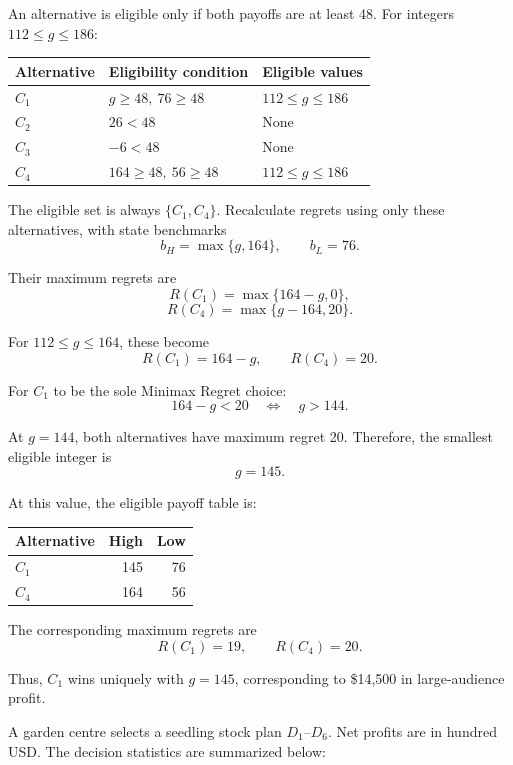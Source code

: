 An alternative is eligible only if both payoffs
are at least 48. For integers $112\le g\le186$:

\begin{center}
\begin{tabular}{lll}\toprule
Alternative & Eligibility condition & Eligible values\\\midrule
$C_1$ & $g\ge48,\ 76\ge48$ & $112\le g\le186$\\
$C_2$ & $26<48$ & None\\
$C_3$ & $-6<48$ & None\\
$C_4$ & $164\ge48,\ 56\ge48$ & $112\le g\le186$\\
\bottomrule
\end{tabular}
\end{center}

The eligible set is always $\{C_1,C_4\}$.
Recalculate regrets using only these alternatives,
with state benchmarks
\[
b_H=\max\{g,164\},\qquad b_L=76.
\]

Their maximum regrets are
\[
R(C_1)=\max\{164-g,0\},
\]
\[
R(C_4)=\max\{g-164,20\}.
\]

For $112\le g\le164$, these become
\[
R(C_1)=164-g,\qquad R(C_4)=20.
\]

For $C_1$ to be the sole Minimax Regret choice:
\[
164-g<20
\quad\Longleftrightarrow\quad g>144.
\]

At $g=144$, both alternatives have maximum regret 20.
Therefore, the smallest eligible integer is
\[
\boxed{g=145}.
\]

At this value, the eligible payoff table is:

\begin{center}\small\setlength{\tabcolsep}{4pt}
\begin{tabular}{lrr}\toprule
Alternative & High & Low\\ \midrule
$C_1$ & 145 & 76\\
$C_4$ & 164 & 56\\
\bottomrule
\end{tabular}
\end{center}

The corresponding maximum regrets are
\[
R(C_1)=19,\qquad R(C_4)=20.
\]

Thus, $C_1$ wins uniquely with $g=145$,
corresponding to \$14,500 in large-audience profit.
\secInicio[sec:q2]



A garden centre selects a seedling stock plan $D_1$--$D_6$. Net profits are in hundred USD. The decision statistics are summarized below:

